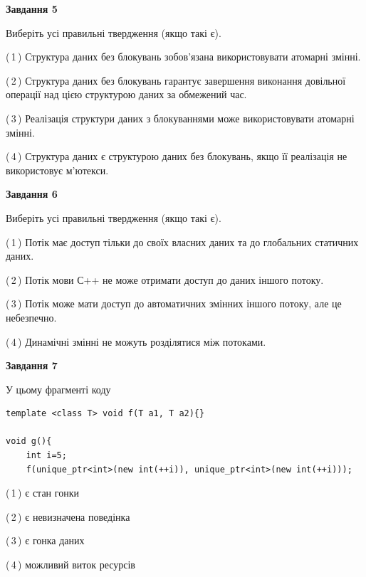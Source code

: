 \documentclass[12pt, ukrainian]{article}
\begin{document}
\begin {large}
{\begin{center}
\textbf{Завдання 5}
\end{center}

Виберіть усі правильні твердження (якщо такі є).\par
\vspace{2mm}

(\,1\,) Структура даних без блокувань зобов’язана використовувати атомарні змінні.%

(\,2\,) Структура даних без блокувань гарантує завершення виконання довільної операції над цією структурою даних за обмежений час.%

(\,3\,) Реалізація структури даних з блокуваннями може використовувати атомарні змінні.%

(\,4\,) Структура даних є структурою даних без блокувань, якщо її реалізація не використовує м’ютекси.%
\newpage


\begin{center}
\textbf{Завдання 6}
\end{center}

Виберіть усі правильні твердження (якщо такі є).\par
\vspace{2mm}

(\,1\,) Потік має доступ тільки до своїх власних даних та до глобальних статичних даних.%

(\,2\,) Потік мови С++ не може отримати доступ до даних іншого потоку.%

(\,3\,) Потік може мати доступ до автоматичних змінних іншого потоку, але це небезпечно.%

(\,4\,) Динамічні змінні не можуть розділятися між потоками.%


\begin{center}
\textbf{Завдання 7}
\end{center}

У цьому фрагменті коду
\begin{verbatim}
template <class T> void f(T a1, T a2){}

void g(){
    int i=5;
    f(unique_ptr<int>(new int(++i)), unique_ptr<int>(new int(++i)));
\end{verbatim}

(\,1\,) є стан гонки%

(\,2\,) є невизначена поведінка%

(\,3\,) є гонка даних%

(\,4\,) можливий виток ресурсів%

}
\end {large}

\vspace{4mm}
\newpage
\end{document}
